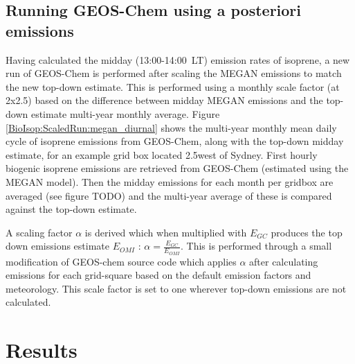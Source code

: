   \subsection{Running GEOS-Chem using a posteriori emissions}
  \label{BioIsop:ScaledRun}
    
    Having calculated the midday (13:00-14:00~LT) emission rates of isoprene, a new run of GEOS-Chem is performed after scaling the MEGAN emissions to match the new top-down estimate.
    This is performed using a monthly scale factor (at 2x2.5\degr) based on the difference between midday MEGAN emissions and the top-down estimate multi-year monthly average.
    Figure \ref{BioIsop:ScaledRun:megan_diurnal} shows the multi-year monthly mean daily cycle of isoprene emissions from GEOS-Chem, along with the top-down midday estimate, for an example grid box located 2.5\degr west of Sydney.
    First hourly biogenic isoprene emissions are retrieved from GEOS-Chem (estimated using the MEGAN model).
    Then the midday emissions for each month per gridbox are averaged (see figure TODO) and the multi-year average of these is compared against the top-down estimate.
    
    
    A scaling factor $\alpha$ is derived which when multiplied with $E_{GC}$ produces the top down emissions estimate $E_{OMI}$ : $\alpha = \frac{E_{GC}}{E_{OMI}}$.
    This is performed through a small modification of GEOS-chem source code which applies $\alpha$ after calculating emissions for each grid-square based on the default emission factors and meteorology.
    This scale factor is set to one wherever top-down emissions are not calculated.

\section{Results}
  \label{BioIsop:Results}
  
